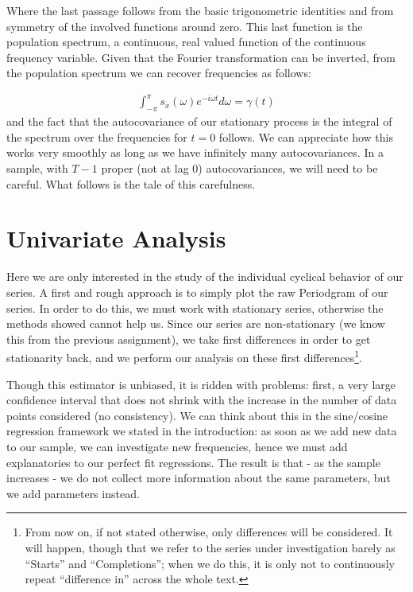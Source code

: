 \documentclass[12pt]{article} %
\begin{document}
Where the last passage follows from the basic trigonometric identities and from symmetry of the involved functions around zero. This last function is the population spectrum, a continuous, real valued function of the continuous frequency variable. Given that the Fourier transformation can be inverted, from the population spectrum we can recover frequencies as follows:

\begin{equation}
\begin{aligned}
\int_{-\pi}^{\pi} s_x(\omega)e^{-i\omega t}d\omega=\gamma(t)
\end{aligned}
\end{equation}and the fact that the autocovariance of our stationary process is the integral of the spectrum over the frequencies for $t=0$ follows. We can appreciate how this works very smoothly as long as we have infinitely many autocovariances. In a sample, with $T-1$ proper (not at lag 0) autocovariances, we will need to be careful. What follows is the tale of this carefulness. 


\section{Univariate Analysis}

Here we are only interested in the study of the individual cyclical behavior of our series. A first and rough approach is to simply plot the raw Periodgram of our series. In order to do this, we must work with stationary series, otherwise the methods showed cannot help us. Since our series are non-stationary (we know this from the previous assignment), we take first differences in order to get stationarity back, and we perform our analysis on these first differences\footnote{From now on, if not stated otherwise, only differences will be considered. It will happen, though that we refer to the series under investigation barely as ``Starts'' and ``Completions''; when we do this, it is only not to continuously repeat ``difference in'' across the whole text.}.

Though this estimator is unbiased, it is ridden with problems: first, a very large confidence interval that does not shrink with the increase in the number of data points considered (no consistency). We can think about this in the sine/cosine regression framework we stated in the introduction: as soon as we add new data to our sample, we can investigate new frequencies, hence we must add explanatories to our perfect fit regressions.  The result is that - as the sample increases - we do not collect more information about the same parameters, but we add parameters instead.
\end{document}
